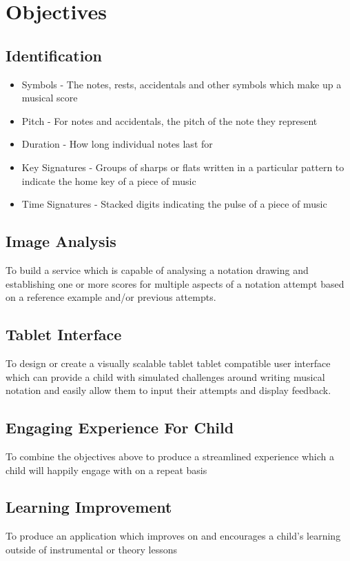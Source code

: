 \section{Objectives}


\subsection{Identification}

\begin{itemize}
  \item Symbols - The notes, rests, accidentals and other symbols which make up a musical score
  \item Pitch - For notes and accidentals, the pitch of the note they represent
  \item Duration - How long individual notes last for
  \item Key Signatures - Groups of sharps or flats written in a particular pattern to indicate the home key of a piece of music
  \item Time Signatures - Stacked digits indicating the pulse of a piece of music
\end{itemize}

\subsection*{Image Analysis}
To build a service which is capable of analysing a notation drawing and establishing one or more scores for multiple aspects of a notation attempt based on a reference example and/or previous attempts.

\subsection*{Tablet Interface}
To design or create a visually scalable tablet tablet compatible user interface which can provide a child with simulated challenges around writing musical notation and easily allow them to input their attempts and display feedback.

\subsection*{Engaging Experience For Child}
To combine the objectives above to produce a streamlined experience which a child will happily engage with on a repeat basis

\subsection*{Learning Improvement}
To produce an application which improves on and encourages a child's learning outside of instrumental or theory lessons
